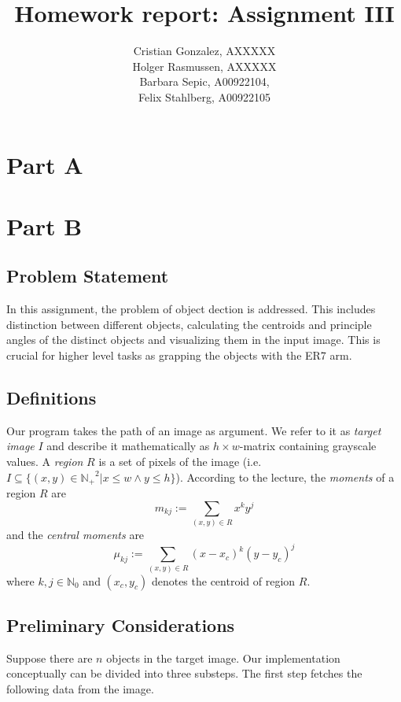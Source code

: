 \documentclass[letter,12pt]{article}
\begin{document}
\title{Homework report: Assignment III}
\author{Cristian Gonzalez, AXXXXX\\
Holger Rasmussen, AXXXXX\\
Barbara Sepic, A00922104,\\
Felix Stahlberg, A00922105
}
\maketitle

\section{Part A}

\section{Part B}

\subsection{Problem Statement}
In this assignment, the problem of object dection is addressed. This includes distinction between different objects, calculating the centroids and principle angles of the distinct objects and visualizing them in the input image. This is crucial for higher level tasks as grapping the objects with the ER7 arm.

\subsection{Definitions}
Our program takes the path of an image as argument. We refer to it as {\em target image} $I$ and describe it mathematically as $h\times w$-matrix containing grayscale values. A {\em region} $R$ is a set of pixels of the image (i.e.\ $I\subseteq \{(x,y)\in {\mathbb{N}_+}^2| x \leq w \land y\leq h\}$). According to the lecture, the {\em moments} of a region $R$ are
\begin{equation*}
m_{kj} := \sum_{(x,y)\in R} x^ky^j
\end{equation*}
and the {\em central moments} are
\begin{equation*}
\mu_{kj} := \sum_{(x,y)\in R} {(x-x_c)}^k{(y-y_c)}^j
\end{equation*}
where $k,j\in \mathbb{N}_0$ and $(x_c, y_c)$ denotes the centroid of region $R$.

\subsection{Preliminary Considerations}
Suppose there are $n$ objects in the target image. Our implementation conceptually can be divided into three substeps. The first step fetches the following data from the image.
\end{document}
